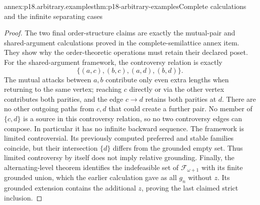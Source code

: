 \begin{annexitem}{annex:p18.arbitrary.examples}{thm:p18-arbitrary-examples}{Complete calculations and the infinite separating cases}
\begin{proof}
The two final order-structure
claims are exactly the
mutual-pair and shared-argument
calculations proved in
the complete-semilattice
annex item. They show
why the order-theoretic
operations must retain
their declared poset.
For the shared-argument
framework, the controversy
relation is exactly
\[
                   \{(a,c),(b,c),(a,d),(b,d)\}.
\]
The mutual attacks between
\(a,b\) contribute only
even extra lengths when
returning to the same
vertex; reaching \(c\)
directly or via the
other vertex contributes
both parities, and the
edge \(c\to d\) retains
both parities at \(d\).
There are no other
outgoing paths from
\(c,d\) that could
create a further pair.
No member of \(\{c,d\}\)
is a source in this
controversy relation,
so no two controversy
edges can compose.
In particular it has
no infinite backward
sequence. The framework
is limited controversial.
Its previously computed
preferred and stable
families coincide,
but their intersection
\(\{d\}\) differs from
the grounded empty set.
Thus limited controversy
by itself does not
imply relative grounding.
Finally, the alternating-level
theorem identifies the
indefeasible set of
\(\mathcal F_{\omega+1}\)
with its finite grounded
union, which the earlier
calculation gave as all
\(g_n\) without \(z\).
Its grounded extension
contains the additional
\(z\), proving the
last claimed strict
inclusion.
\end{proof}
\end{annexitem}


